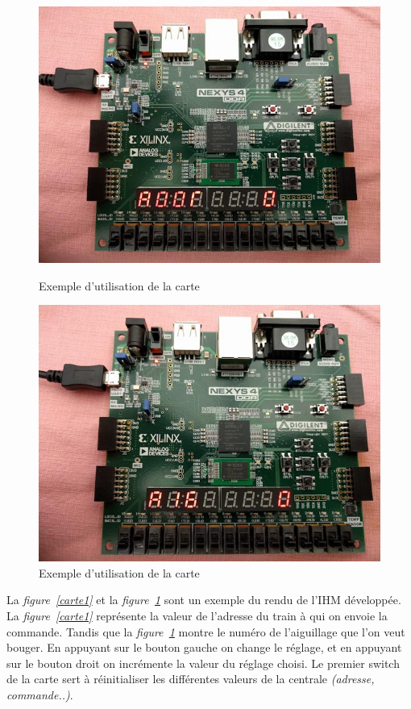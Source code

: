 \begin{figure}[h]
    \begin{minipage}[c]{.46\linewidth}
        \centering
        \includegraphics[scale=0.3]{exe_add.jpg}
        \caption{Exemple d'utilisation de la carte}
        \label{carte1}
    \end{minipage}
    \hfill%
    \begin{minipage}[c]{.46\linewidth}
        \centering
        \includegraphics[scale=0.3]{exe_aigui.jpg}
        \caption{Exemple d'utilisation de la carte}
        \label{carte2}
    \end{minipage}
\end{figure}

La \emph{figure~\ref{carte1}} et la \emph{figure~\ref{carte2}} sont un
exemple du rendu de l'IHM d\'evelopp\'ee.
La \emph{figure~\ref{carte1}} représente la valeur de l'adresse du
train à qui on envoie la commande.
Tandis que la \emph{figure~\ref{carte2}} montre le numéro de
l'aiguillage que l'on veut bouger.
En appuyant sur le bouton gauche on change le réglage, et en appuyant sur le
bouton droit on incrémente la valeur du réglage choisi.
Le premier switch de la carte sert à réinitialiser les différentes
valeurs de la centrale \emph{(adresse, commande..)}.


